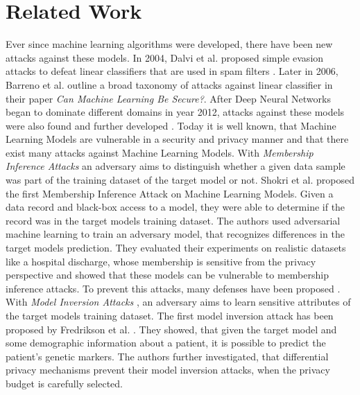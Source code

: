 \chapter{Related Work}

  Ever since machine learning algorithms were developed, there have been new attacks against these models.
  In 2004, Dalvi et al. proposed simple evasion attacks to defeat linear classifiers that are used in spam filters \cite{10.1145/1014052.1014066}.
  Later in 2006, Barreno et al. outline a broad taxonomy of attacks against linear classifier in their paper \emph{Can Machine Learning Be Secure?}\cite{10.1145/1128817.1128824}.
  After Deep Neural Networks began to dominate different domains in year 2012, attacks against these models were also found and further developed \cite{szegedy2014intriguing, Biggio_2018}.
  Today it is well known, that Machine Learning Models are vulnerable in a security and privacy manner and that there exist many attacks against Machine Learning Models.
  With \emph{Membership Inference Attacks} \cite{carlini2019secret, chen2018differentially, 7958568, truex2019demystifying, hayes2018logan} an adversary aims to distinguish whether a given data sample was part of the training dataset of the target model or not.
  Shokri et al. \cite{7958568} proposed the first Membership Inference Attack on Machine Learning Models.
  Given a data record and black-box access to a model, they were able to determine if the record was in the target models training dataset.
  The authors used adversarial machine learning to train an adversary model, that recognizes differences in the target models prediction.
  They evaluated their experiments on realistic datasets like a hospital discharge, whose membership is sensitive from the privacy perspective and showed that these models can be vulnerable to membership inference attacks. To prevent this attacks, many defenses have been proposed \cite{10.1145/3319535.3363201, 7958568, salem2018mlleaks, Li_2021}.
  With \emph{Model Inversion Attacks} \cite{PMID:27077138, 8476925, 10.1145/2810103.2813677, chen2020improved}, an adversary aims to learn sensitive attributes of the target models training dataset.
  The first model inversion attack has been proposed by Fredrikson et al. \cite{PMID:27077138}.
  They showed, that given the target model and some demographic information about a patient, it is possible to predict the patient's genetic markers.
  The authors further investigated, that differential privacy mechanisms prevent their model inversion attacks, when the privacy budget is carefully selected.

